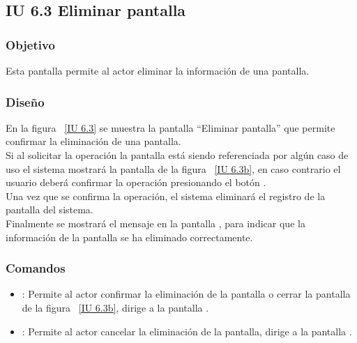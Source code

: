 \subsection{IU 6.3 Eliminar pantalla}

\subsubsection{Objetivo}
	
	Esta pantalla permite al actor eliminar la información de una pantalla.

\subsubsection{Diseño}

    En la figura ~\ref{IU 6.3} se muestra la pantalla ``Eliminar pantalla'' que permite confirmar la eliminación de una pantalla. \\
    
    Si al solicitar la operación la pantalla está siendo referenciada por algún caso de uso el sistema mostrará la pantalla de la figura ~\ref{IU 6.3b}, en caso contrario el usuario 
    deberá confirmar la operación presionando el botón .\\
    
    Una vez que se confirma la operación, el sistema eliminará el registro de la pantalla del sistema.  \\
    
    Finalmente se mostrará el mensaje  en la pantalla , 
    para indicar que la información de la pantalla
    se ha eliminado correctamente.        



\subsubsection{Comandos}
\begin{itemize}
	\item {}: Permite al actor confirmar la eliminación de la pantalla o cerrar la pantalla de la figura ~\ref{IU 6.3b}, dirige a la pantalla .
	\item {}: Permite al actor cancelar la eliminación de la pantalla, dirige a la pantalla .
\end{itemize}

